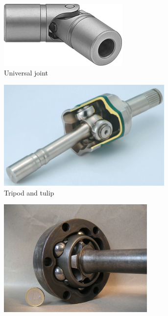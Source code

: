 \documentclass[10pt,letterpaper]{book}
\begin{document}
\begin{figure}[H]
		\begin{subfigure}[b]{.24\linewidth}
			\includegraphics[width=0.7\textwidth]{imgs/coupling_ujoint.png}
			\caption{Universal joint}
		\end{subfigure}
		\begin{subfigure}[b]{.24\linewidth}
			\includegraphics[width=0.95\textwidth]{imgs/coupling_tripod.png}
			\caption{Tripod and tulip}
		\end{subfigure}
		\begin{subfigure}[b]{.24\linewidth}
			\includegraphics[width=0.85\textwidth]{imgs/coupling_rzeppa.jpeg}

\end{subfigure}
\end{figure}
\end{document}
